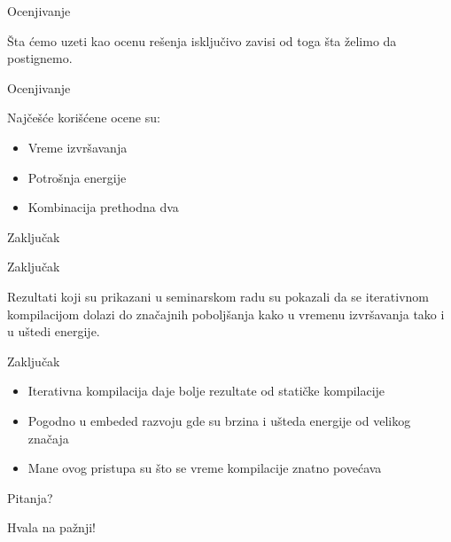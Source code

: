 \documentclass[10pt]{beamer}
\begin{document}
\begin{frame}{Ocenjivanje}

   Šta ćemo uzeti kao ocenu rešenja isključivo zavisi od toga šta želimo da postignemo.

\end{frame}

\begin{frame}{Ocenjivanje}

    Najčešće korišćene ocene su:
    \begin{itemize} 
      \item Vreme izvršavanja
      \item Potrošnja energije
      \item Kombinacija prethodna dva
    \end{itemize}

\end{frame}

\begin{frame}[standout]
  Zaključak
\end{frame}

\begin{frame}{Zaključak}

  Rezultati koji su prikazani u seminarskom radu su
  pokazali da se iterativnom kompilacijom dolazi do 
  značajnih poboljšanja kako u vremenu izvršavanja tako i 
  u uštedi energije.

\end{frame}

\begin{frame}{Zaključak}

  \begin{itemize}[<+- | @alert->]
    \item Iterativna kompilacija daje bolje rezultate od statičke kompilacije
    \item Pogodno u embeded razvoju gde su brzina i ušteda energije od velikog značaja
    \item Mane ovog pristupa su što se vreme kompilacije znatno povećava
  \end{itemize}

\end{frame}

\begin{frame}[standout]
  Pitanja?
\end{frame}
\begin{frame}[standout]
  Hvala na pažnji!
\end{frame}
\end{document}

